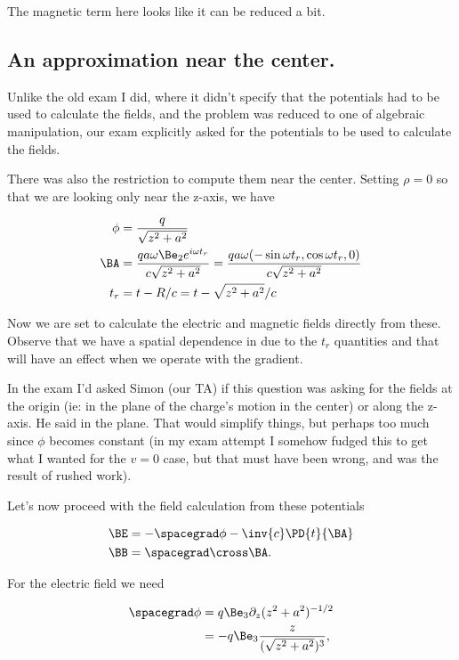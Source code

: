 The magnetic term here looks like it can be reduced a bit.

\subsection{An approximation near the center.}

Unlike the old exam I did, where it didn't specify that the potentials had to be used to calculate the fields, and the problem was reduced to one of algebraic manipulation, our exam explicitly asked for the potentials to be used to calculate the fields.

There was also the restriction to compute them near the center.  Setting $\rho = 0$ so that we are looking only near the z-axis, we have

\begin{align}\label{eqn:relativisticElectrodynamicsExamReflection:170}
\phi &= \frac{q}{\sqrt{z^2 + a^2}} \\
\BA 
&= 
\frac{q a \omega \Be_2 e^{i \omega t_r} }{c \sqrt{z^2 + a^2}} 
= 
\frac{q a \omega (-\sin \omega t_r, \cos\omega t_r, 0)}{c \sqrt{z^2 + a^2}} \\
t_r &= t - R/c = t - \sqrt{z^2 + a^2}/c
\end{align}

Now we are set to calculate the electric and magnetic fields directly from these.  Observe that we have a spatial dependence in due to the $t_r$ quantities and that will have an effect when we operate with the gradient.  

In the exam I'd asked Simon (our TA) if this question was asking for the fields at the origin (ie: in the plane of the charge's motion in the center) or along the z-axis.  He said in the plane.  That would simplify things, but perhaps too much since $\phi$ becomes constant (in my exam attempt I somehow fudged this to get what I wanted for the $v = 0$ case, but that must have been wrong, and was the result of rushed work).

Let's now proceed with the field calculation from these potentials

\begin{align}\label{eqn:relativisticElectrodynamicsExamReflection:190}
\BE &= - \spacegrad \phi - \inv{c} \PD{t}{\BA} \\
\BB &= \spacegrad \cross \BA.
\end{align}

For the electric field we need

\begin{align*}
\spacegrad \phi 
&= q \Be_3 \partial_z (z^2 + a^2)^{-1/2} \\
&= -q \Be_3 \frac{z}{(\sqrt{z^2 + a^2})^3},
\end{align*}

